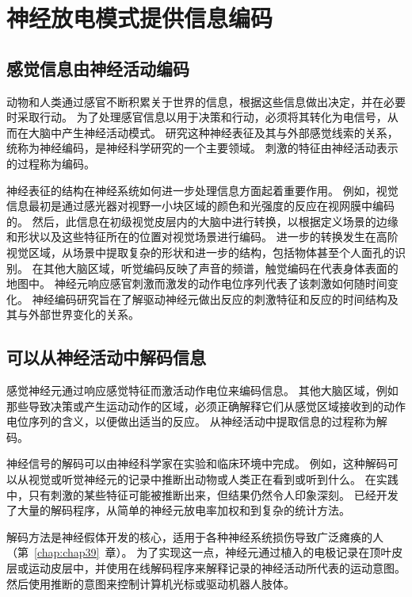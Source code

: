 \section{神经放电模式提供信息编码}

\subsection{感觉信息由神经活动编码}

动物和人类通过感官不断积累关于世界的信息，根据这些信息做出决定，并在必要时采取行动。
为了处理感官信息以用于决策和行动，必须将其转化为电信号，从而在大脑中产生神经活动模式。
研究这种神经表征及其与外部感觉线索的关系，统称为神经编码，是神经科学研究的一个主要领域。
刺激的特征由神经活动表示的过程称为编码。


神经表征的结构在神经系统如何进一步处理信息方面起着重要作用。
例如，视觉信息最初是通过感光器对视野一小块区域的颜色和光强度的反应在视网膜中编码的。
然后，此信息在初级视觉皮层内的大脑中进行转换，以根据定义场景的边缘和形状以及这些特征所在的位置对视觉场景进行编码。
进一步的转换发生在高阶视觉区域，从场景中提取复杂的形状和进一步的结构，包括物体甚至个人面孔的识别。
在其他大脑区域，听觉编码反映了声音的频谱，触觉编码在代表身体表面的地图中。
神经元响应感官刺激而激发的动作电位序列代表了该刺激如何随时间变化。
神经编码研究旨在了解驱动神经元做出反应的刺激特征和反应的时间结构及其与外部世界变化的关系。



\subsection{可以从神经活动中解码信息}

感觉神经元通过响应感觉特征而激活动作电位来编码信息。
其他大脑区域，例如那些导致决策或产生运动动作的区域，必须正确解释它们从感觉区域接收到的动作电位序列的含义，以便做出适当的反应。
从神经活动中提取信息的过程称为解码。


神经信号的解码可以由神经科学家在实验和临床环境中完成。
例如，这种解码可以从视觉或听觉神经元的记录中推断出动物或人类正在看到或听到什么。
在实践中，只有刺激的某些特征可能被推断出来，但结果仍然令人印象深刻。
已经开发了大量的解码程序，从简单的神经元放电率加权和到复杂的统计方法。


解码方法是神经假体开发的核心，适用于各种神经系统损伤导致广泛瘫痪的人（第~\ref{chap:chap39}~章）。
为了实现这一点，神经元通过植入的电极记录在顶叶皮层或运动皮层中，并使用在线解码程序来解释记录的神经活动所代表的运动意图。
然后使用推断的意图来控制计算机光标或驱动机器人肢体。


